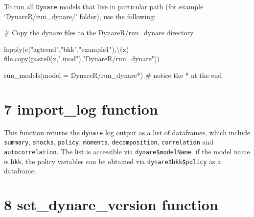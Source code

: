 \documentclass[
  letterpaper,
  DIV=11,
  numbers=noendperiod]{scrartcl}
\newenvironment{Shaded}{\begin{snugshade}}{\end{snugshade}}
\newcommand{\AttributeTok}[1]{\textcolor[rgb]{0.40,0.45,0.13}{#1}}
\newcommand{\CommentTok}[1]{\textcolor[rgb]{0.37,0.37,0.37}{#1}}
\newcommand{\FunctionTok}[1]{\textcolor[rgb]{0.28,0.35,0.67}{#1}}
\newcommand{\NormalTok}[1]{\textcolor[rgb]{0.00,0.23,0.31}{#1}}
\newcommand{\SpecialCharTok}[1]{\textcolor[rgb]{0.37,0.37,0.37}{#1}}
\newcommand{\StringTok}[1]{\textcolor[rgb]{0.13,0.47,0.30}{#1}}
\begin{document}
To run all \texttt{Dynare} models that live in particular path (for
example `DynareR/run\_dynare/' folder), use the following:

\begin{Shaded}
\begin{Highlighting}[]
\CommentTok{\# Copy the dynare files to the \textquotesingle{}DynareR/run\_dynare\textquotesingle{} directory}

\FunctionTok{lapply}\NormalTok{(}\FunctionTok{c}\NormalTok{(}\StringTok{"agtrend"}\NormalTok{,}\StringTok{"bkk"}\NormalTok{,}\StringTok{"example1"}\NormalTok{),\textbackslash{}(x) }\FunctionTok{file.copy}\NormalTok{(}\FunctionTok{paste0}\NormalTok{(x,}\StringTok{".mod"}\NormalTok{),}\StringTok{"DynareR/run\_dynare"}\NormalTok{))}

\FunctionTok{run\_models}\NormalTok{(}\AttributeTok{model =} \StringTok{\textquotesingle{}DynareR/run\_dynare*\textquotesingle{}}\NormalTok{) }\CommentTok{\# notice the * at the end}
\end{Highlighting}
\end{Shaded}

\hypertarget{import_log-function}{%
\section{7 import\_log function}\label{import_log-function}}

This function returns the \texttt{dynare} log output as a list of
dataframes, which include \texttt{summary}, \texttt{shocks},
\texttt{policy}, \texttt{moments}, \texttt{decomposition},
\texttt{correlation} and \texttt{autocorrelation}. The list is
accessible via \texttt{dynare\$modelName}. if the model name is
\texttt{bkk}, the policy variables can be obtained via
\texttt{dynare\$bkk\$policy} as a dataframe.

\begin{Shaded}
\end{Shaded}

\hypertarget{set_dynare_version-function}{%
\section{8 set\_dynare\_version
function}\label{set_dynare_version-function}}
\end{document}
